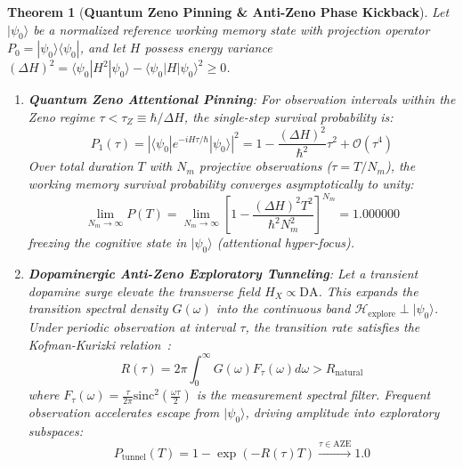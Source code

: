 \documentclass[10pt,twocolumn,3p]{article}
\newtheorem{theorem}{Theorem}
\begin{document}
\begin{theorem}[\textbf{Quantum Zeno Pinning \& Anti-Zeno Phase Kickback}]
\label{thm:zeno_antizeno}
Let $|\psi_0\rangle$ be a normalized reference working memory state with projection operator $P_0 = |\psi_0\rangle \langle \psi_0|$, and let $H$ possess energy variance $(\Delta H)^2 = \langle \psi_0 | H^2 | \psi_0 \rangle - \langle \psi_0 | H | \psi_0 \rangle^2 \ge 0$.

\begin{enumerate}
    \item \textbf{Quantum Zeno Attentional Pinning}:
    For observation intervals within the Zeno regime $\tau < \tau_Z \equiv \hbar / \Delta H$, the single-step survival probability is:
    \begin{equation}
        P_1(\tau) = |\langle \psi_0 | e^{-i H \tau / \hbar} | \psi_0 \rangle|^2 = 1 - \frac{(\Delta H)^2}{\hbar^2} \tau^2 + \mathcal{O}(\tau^4)
        \label{eq:P1_parabolic}
    \end{equation}
    Over total duration $T$ with $N_m$ projective observations ($\tau = T/N_m$), the working memory survival probability converges asymptotically to unity:
    \begin{equation}
        \lim_{N_m \to \infty} P(T) = \lim_{N_m \to \infty} \left[ 1 - \frac{(\Delta H)^2 T^2}{\hbar^2 N_m^2} \right]^{N_m} = 1.000000
        \label{eq:zeno_limit}
    \end{equation}
    freezing the cognitive state in $|\psi_0\rangle$ (attentional hyper-focus).
    
    \item \textbf{Dopaminergic Anti-Zeno Exploratory Tunneling}:
    Let a transient dopamine surge elevate the transverse field $H_X \propto \text{DA}$. This expands the transition spectral density $G(\omega)$ into the continuous band $\mathcal{H}_{\text{explore}} \perp |\psi_0\rangle$. Under periodic observation at interval $\tau$, the transition rate satisfies the Kofman-Kurizki relation~\cite{kofman2000}:
    \begin{equation}
        R(\tau) = 2\pi \int_0^\infty G(\omega) F_\tau(\omega) d\omega > R_{\text{natural}}
        \label{eq:antizeno_rate}
    \end{equation}
    where $F_\tau(\omega) = \frac{\tau}{2\pi} \text{sinc}^2(\frac{\omega \tau}{2})$ is the measurement spectral filter. Frequent observation accelerates escape from $|\psi_0\rangle$, driving amplitude into exploratory subspaces:
    \begin{equation}
        P_{\text{tunnel}}(T) = 1 - \exp(-R(\tau) T) \xrightarrow{\tau \in \text{AZE}} 1.0
    \end{equation}
    

\end{enumerate}
\end{theorem}
\end{document}
